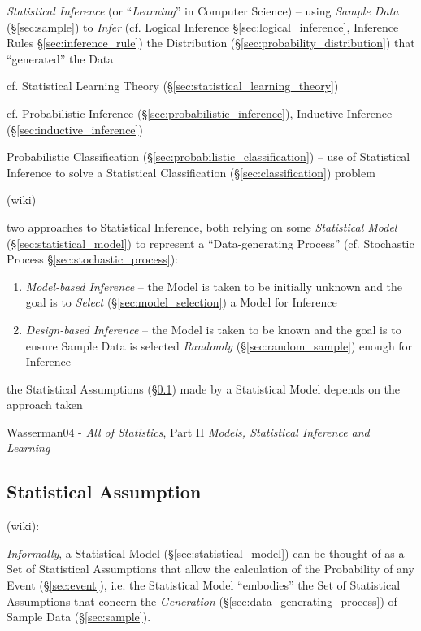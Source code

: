 \emph{Statistical Inference} (or ``\emph{Learning}'' in Computer Science) --
using \emph{Sample Data} (\S\ref{sec:sample}) to \emph{Infer} (cf. Logical
Inference \S\ref{sec:logical_inference}, Inference Rules
\S\ref{sec:inference_rule}) the Distribution
(\S\ref{sec:probability_distribution}) that ``generated'' the Data

\fist cf. Statistical Learning Theory (\S\ref{sec:statistical_learning_theory})

\fist cf. Probabilistic Inference
(\S\ref{sec:probabilistic_inference}), Inductive Inference
(\S\ref{sec:inductive_inference})

\fist Probabilistic Classification (\S\ref{sec:probabilistic_classification}) --
use of Statistical Inference to solve a Statistical Classification
(\S\ref{sec:classification}) problem

(wiki)

two approaches to Statistical Inference, both relying on some \emph{Statistical
  Model} (\S\ref{sec:statistical_model}) to represent a ``Data-generating
Process'' (cf. Stochastic Process \S\ref{sec:stochastic_process}):
\begin{enumerate}
  \item \emph{Model-based Inference} -- the Model is taken to be initially
    unknown and the goal is to \emph{Select} (\S\ref{sec:model_selection}) a
    Model for Inference
  \item \emph{Design-based Inference} -- the Model is taken to be known and the
    goal is to ensure Sample Data is selected \emph{Randomly}
    (\S\ref{sec:random_sample}) enough for Inference
\end{enumerate}
the Statistical Assumptions (\S\ref{sec:statistical_assumption}) made by a
Statistical Model depends on the approach taken

Wasserman04 - \emph{All of Statistics}, Part II \emph{Models, Statistical
  Inference and Learning}



\subsection{Statistical Assumption}\label{sec:statistical_assumption}

(wiki):

\emph{Informally}, a Statistical Model (\S\ref{sec:statistical_model}) can be
thought of as a Set of Statistical Assumptions that allow the calculation of the
Probability of any Event (\S\ref{sec:event}), i.e. the Statistical Model
``embodies'' the Set of Statistical Assumptions that concern the
\emph{Generation} (\S\ref{sec:data_generating_process}) of Sample Data
(\S\ref{sec:sample}).

